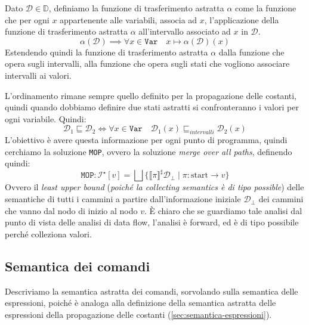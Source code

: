 Dato $\mathcal{D} \in \mathbb{D}$, definiamo la funzione di trasferimento
astratta $\alpha$ come la funzione che per ogni $x$ appartenente alle 
variabili, associa ad $x$, l'applicazione della funzione di trasferimento
astratta $\alpha$ all'intervallo associato ad $x$ in $\mathcal{D}$.
\[
   \alpha(\mathcal{D}) \implies \forall x \in \texttt{Var} 
   \quad x \mapsto \alpha(\mathcal{D})(x) 
\]
Estendendo quindi la funzione di trasferimento astratta $\alpha$ 
dalla funzione che opera sugli intervalli, alla funzione che opera
sugli stati che vogliono associare intervalli ai valori.

L'ordinamento rimane sempre quello definito per la propagazione 
delle costanti, quindi quando dobbiamo definire due stati astratti
si confronteranno i valori per ogni variabile.
Quindi:
\[
  \mathcal{D}_1 \sqsubseteq \mathcal{D}_2 \iff \forall x \in \texttt{Var} 
  \quad \mathcal{D}_1(x) \sqsubseteq_{intervalli} \mathcal{D}_2(x)
\]
L'obiettivo è avere questa informazione 
per ogni punto di programma, quindi cerchiamo la soluzione \texttt{MOP}, ovvero la
soluzione \textit{merge over all paths}, definendo quindi:
\[
    \texttt{MOP} : \mathcal{I}^\star [v] = \bigsqcup 
    \{ \llbracket \pi \rrbracket^\sharp \mathcal{D}_\bot \mid \pi:\text{start} \to v \}
\]
Ovvero il \textit{least upper bound}  (\textit{poiché la collecting semantics è di tipo possible}) 
delle semantiche di tutti i cammini a partire dall'informazione iniziale $\mathcal{D}_\bot$
dei cammini 
che vanno dal nodo di inizio al nodo $v$. È chiaro che se guardiamo tale analisi dal punto di vista delle 
analisi di data flow, l'analisi è forward, ed è di tipo possibile perché colleziona valori.

\subsection{Semantica dei comandi}
Descriviamo la semantica astratta dei comandi, sorvolando sulla semantica
delle espressioni, poiché è analoga alla definizione della semantica
astratta delle espressioni della propagazione delle costanti
(\ref{sec:semantica-espressioni}).

